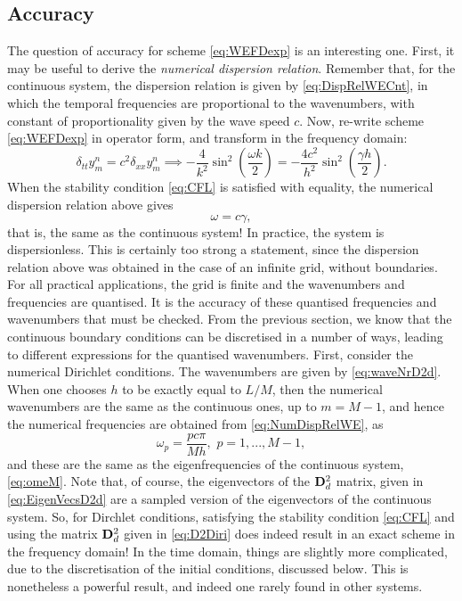 \documentclass[11pt,twoside,a4paper,english]{book}
\newcommand{\dss}{\delta_{xx}}
\newcommand{\dtt}{\delta_{tt}}
\begin{document}
\subsection{Accuracy}


The question of accuracy for scheme \eqref{eq:WEFDexp} is an interesting one. First, it may be useful to derive the \emph{numerical dispersion relation}. Remember that, for the continuous system, the dispersion relation is given by \eqref{eq:DispRelWECnt}, in which the temporal frequencies are proportional to the wavenumbers, with constant of proportionality given by the wave speed $c$. Now, re-write scheme \eqref{eq:WEFDexp} in operator form, and transform in the frequency domain:
\begin{equation}\label{eq:WEfdOperator}
\dtt y^n_m = c^2 \dss y^n_m \implies -\frac{4}{k^2}\sin^2 \left( \frac{\omega k}{2}\right) = -\frac{4 c^2}{h^2}\sin^2 \left( \frac{\gamma h}{2}\right).{}
\end{equation}
When the stability condition \eqref{eq:CFL} is satisfied with equality, the numerical dispersion relation above gives
\begin{equation}\label{eq:NumDispRelWE}
\omega = c \gamma,
\end{equation}
that is, the same as the continuous system! In practice, the system is dispersionless. This is certainly too strong a statement, since the dispersion relation above was obtained in the case of an infinite grid, without boundaries. For all practical applications, the grid is finite and the wavenumbers and frequencies are quantised. It is the accuracy of these quantised frequencies and wavenumbers that must be checked. From the previous section, we know that the continuous boundary conditions can be discretised in a number of ways, leading to different expressions for the quantised wavenumbers. First, consider the numerical Dirichlet conditions. The wavenumbers are given by \eqref{eq:waveNrD2d}. When one chooses $h$ to be exactly equal to $L/M$, then the numerical wavenumbers are the same as the continuous ones, up to $m=M-1$, and hence the numerical frequencies are obtained from \eqref{eq:NumDispRelWE}, as
\begin{equation}
\omega_p = \frac{pc\pi}{Mh}, \,\, p = 1,...,M-1,
\end{equation}
and these are the same as the eigenfrequencies of the continuous system, \eqref{eq:omeM}. Note that, of course, the eigenvectors of the ${\bf D}^2_{d}$ matrix, given in \eqref{eq:EigenVecsD2d} are a sampled version of the eigenvectors of the continuous system. So, for Dirchlet conditions, satisfying the stability condition \eqref{eq:CFL} and using the matrix ${\bf D}^2_{d}$ given in \eqref{eq:D2Diri} does indeed result in an exact scheme in the frequency domain! In the time domain, things are slightly more complicated, due to the discretisation of the initial conditions, discussed below. This is nonetheless a powerful result, and indeed one rarely found in other systems. 
\end{document}
